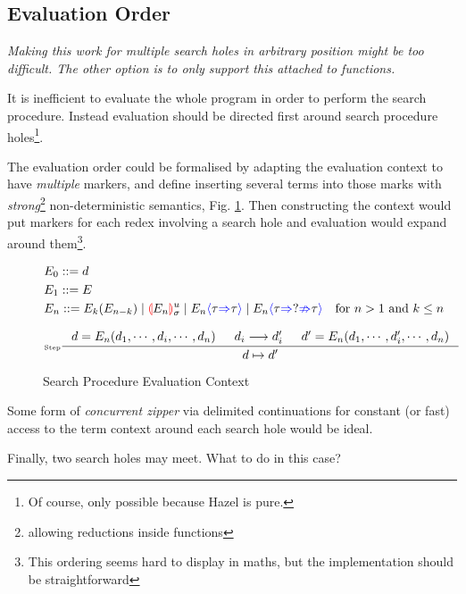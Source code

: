 \subsection{Evaluation Order}
\textit{Making this work for multiple search holes in arbitrary position might be too difficult. The other option is to only support this attached to functions.}\par
It is inefficient to evaluate the whole program in order to perform the search procedure. Instead evaluation should be directed first around search procedure holes\footnote{Of course, only possible because Hazel is pure.}.\par
The evaluation order could be formalised by adapting the evaluation context to have \textit{multiple} markers, and define inserting several terms into those marks with \textit{strong}\footnote{allowing reductions inside functions} non-deterministic semantics, Fig. \ref{fig:searchevaluationorder}. Then constructing the context would put markers for each redex involving a search hole and evaluation would expand around them\footnote{This ordering seems hard to display in maths, but the implementation should be straightforward}.

\begin{figure}[h]
\tiny
\begin{align*}
&E_0 ::= d\\
&E_1 ::= E\\
&E_n ::= E_k(E_{n-k}) \mid \hole[E_n]^u_\sigma \mid E_n\scast{\tau}{\tau} \mid E_n\scasterror{\tau}{\tau} && \text{for $n>1$ and $k\leq n$}
\end{align*} 

\[\inference[\tiny Step]{d = E_n(d_1, \cdots, d_i, \cdots, d_n) & d_i \longrightarrow d_i' & d' = E_n(d_1, \cdots,  d_i',\cdots, d_n)}{d \mapsto d'}\]

\caption{Search Procedure Evaluation Context}
\label{fig:searchevaluationorder}
\end{figure}
\par
Some form of \textit{concurrent zipper} via delimited continuations \cite{ConcurrentZipper, MultiZipper} for constant (or fast) access to the term context around each search hole would be ideal.\par 
Finally, two search holes may meet. What to do in this case?

